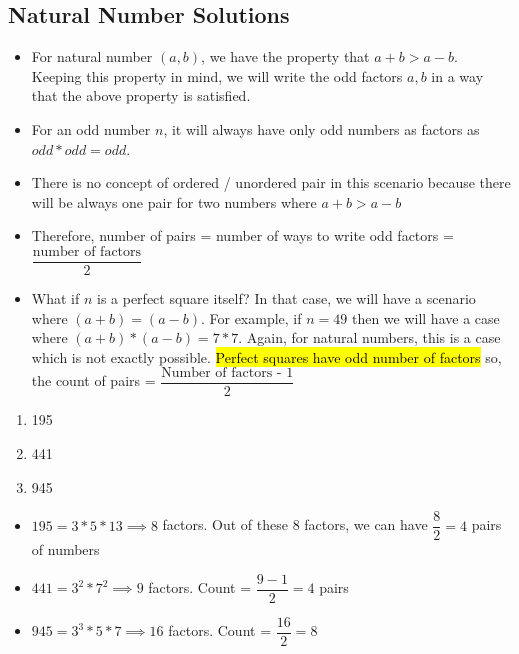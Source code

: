 \subsection{Natural Number Solutions}

\begin{itemize}
    \item For natural number $(a,b)$, we have the property that $a + b > a - b$. Keeping this property in mind, we will write the odd factors $a,b$ in a way that the above property is satisfied. 
    \item For an odd number $n$, it will always have only odd numbers as factors as $odd * odd = odd$. 
    
    \item There is no concept of ordered / unordered pair in this scenario because there will be always one pair for two numbers where $a + b > a - b$

    \item Therefore, number of pairs = number of ways to write odd factors = $\dfrac{\text{number of factors}}{2}$

    \item What if $n$ is a perfect square itself? In that case, we will have a scenario where $(a+b) = (a-b)$. For example, if $n = 49$ then we will have a case where $(a+b) * (a-b) = 7 * 7$. Again, for natural numbers, this is a case which is not exactly possible. \hl{Perfect squares have odd number of factors} so, the count of pairs = $\dfrac{\text{Number of factors - 1}}{2}$
\end{itemize}

\begin{enumerate}
    \item 195
    \item 441
    \item 945
\end{enumerate}

\begin{itemize}
    \item $195 = 3 * 5 * 13 \implies 8$ factors. Out of these 8 factors, we can have $\dfrac{8}{2} = 4$ pairs of numbers
    
    \item $441 = 3^2 * 7^2 \implies 9 $ factors. Count = $\dfrac{9 - 1}{2} = 4$ pairs

    \item $945 = 3^3 * 5 * 7 \implies 16 $ factors. Count = $\dfrac{16}{2} = 8$
\end{itemize}

